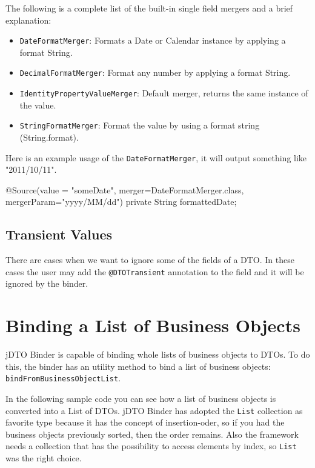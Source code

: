 \documentclass[11pt]{article}
\newcommand{\JDTO}{jDTO Binder\xspace}
\begin{document}
The following is a complete list of the built-in single field mergers and a brief explanation:

\begin{itemize}
 \item \texttt{DateFormatMerger}: Formats a Date or Calendar instance by applying a format String.
 \item \texttt{DecimalFormatMerger}: Format any number by applying a format String.
 \item \texttt{IdentityPropertyValueMerger}: Default merger, returns the same instance of the value.
 \item \texttt{StringFormatMerger}: Format the value by using a format string (String.format).
\end{itemize}

Here is an example usage of the \texttt{DateFormatMerger}, it will output something like "2011/10/11".


\begin{java}
@Source(value = "someDate", 
    merger=DateFormatMerger.class, mergerParam="yyyy/MM/dd")
private String formattedDate;
\end{java}

\subsection{Transient Values}


There are cases when we want to ignore some of the fields of a DTO. In these cases the user may add the \texttt{@DTOTransient} annotation to the field and it will be ignored by the binder.

\section{Binding a List of Business Objects}


\JDTO is capable of binding whole lists of business objects to DTOs. To do this, the binder has an utility method to bind a list of business objects: \texttt{bindFromBusinessObjectList}.

In the following sample code you can see how a list of business objects is converted into a List of DTOs. \JDTO has adopted the \texttt{List} collection as favorite type because it has the concept of insertion-oder, so if you had the business objects previously sorted, then the order remains. Also the framework needs a collection that has the possibility to access elements by index, so \texttt{List} was the right choice.
\end{document}

